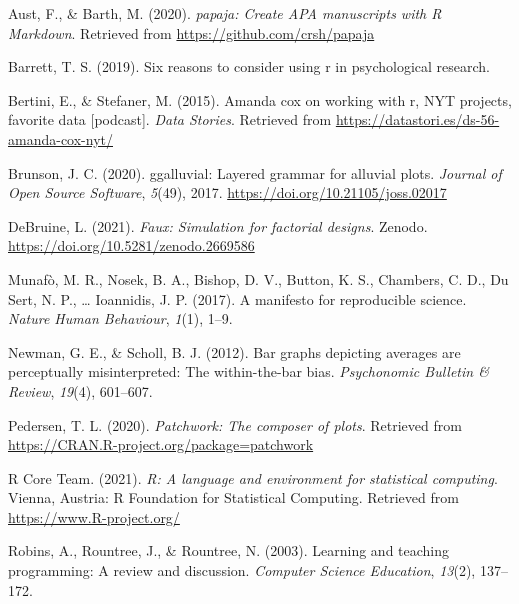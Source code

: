 \documentclass[
  english,
  doc,floatsintext]{apa6}
\newlength{\cslhangindent}
\newenvironment{CSLReferences}[2] %
 {%
  \setlength{\parindent}{0pt}
  \ifodd #1 \everypar{\setlength{\hangindent}{\cslhangindent}}\ignorespaces\fi
  \ifnum #2 > 0
  \setlength{\parskip}{#2\baselineskip}
  \fi
 }%
 {}
\begin{document}
\hypertarget{refs}{}
\begin{CSLReferences}{1}{0}
\leavevmode{}%
Aust, F., \& Barth, M. (2020). \emph{{papaja}: {Create} {APA} manuscripts with {R Markdown}}. Retrieved from \url{https://github.com/crsh/papaja}

\leavevmode{}%
Barrett, T. S. (2019). Six reasons to consider using r in psychological research.

\leavevmode{}%
Bertini, E., \& Stefaner, M. (2015). Amanda cox on working with r, NYT projects, favorite data {[}podcast{]}. \emph{Data Stories}. Retrieved from \url{https://datastori.es/ds-56-amanda-cox-nyt/}

\leavevmode{}%
Brunson, J. C. (2020). {ggalluvial}: Layered grammar for alluvial plots. \emph{Journal of Open Source Software}, \emph{5}(49), 2017. \url{https://doi.org/10.21105/joss.02017}

\leavevmode{}%
DeBruine, L. (2021). \emph{Faux: Simulation for factorial designs}. Zenodo. \url{https://doi.org/10.5281/zenodo.2669586}

\leavevmode{}%
Munafò, M. R., Nosek, B. A., Bishop, D. V., Button, K. S., Chambers, C. D., Du Sert, N. P., \ldots{} Ioannidis, J. P. (2017). A manifesto for reproducible science. \emph{Nature Human Behaviour}, \emph{1}(1), 1--9.

\leavevmode{}%
Newman, G. E., \& Scholl, B. J. (2012). Bar graphs depicting averages are perceptually misinterpreted: The within-the-bar bias. \emph{Psychonomic Bulletin \& Review}, \emph{19}(4), 601--607.

\leavevmode{}%
Pedersen, T. L. (2020). \emph{Patchwork: The composer of plots}. Retrieved from \url{https://CRAN.R-project.org/package=patchwork}

\leavevmode{}%
R Core Team. (2021). \emph{R: A language and environment for statistical computing}. Vienna, Austria: R Foundation for Statistical Computing. Retrieved from \url{https://www.R-project.org/}

\leavevmode{}%
Robins, A., Rountree, J., \& Rountree, N. (2003). Learning and teaching programming: A review and discussion. \emph{Computer Science Education}, \emph{13}(2), 137--172.


\end{CSLReferences}
\end{document}
